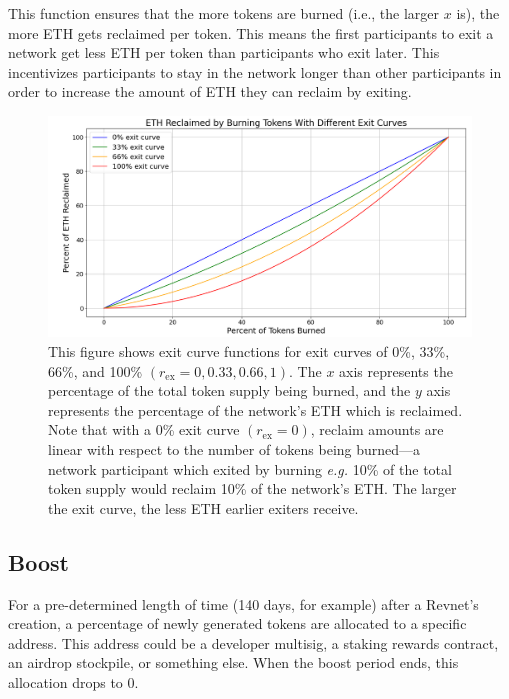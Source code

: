 \documentclass{article}
\begin{document}
This function ensures that the more tokens are burned (i.e., the larger $x$ is), the more ETH gets reclaimed per token. This means the first participants to exit a network get less ETH per token than participants who exit later. This incentivizes participants to stay in the network longer than other participants in order to increase the amount of ETH they can reclaim by exiting.

\begin{figure}[ht]
  \centering
  \includegraphics[width=\textwidth]{figures/multi-exit-curves.png}
  \caption{This figure shows exit curve functions for exit curves of 0\%, 33\%, 66\%, and 100\% $(r_{\text{ex}} = 0, 0.33, 0.66, 1)$. The $x$ axis represents the percentage of the total token supply being burned, and the $y$ axis represents the percentage of the network's ETH which is reclaimed. Note that with a 0\% exit curve $(r_{\text{ex}} = 0)$, reclaim amounts are linear with respect to the number of tokens being burned---a network participant which exited by burning \textit{e.g.} 10\% of the total token supply would reclaim 10\% of the network's ETH. The larger the exit curve, the less ETH earlier exiters receive.}
\end{figure}

\subsection{Boost}


For a pre-determined length of time (140 days, for example) after a Revnet's creation, a percentage of newly generated tokens are allocated to a specific address. This address could be a developer multisig, a staking rewards contract, an airdrop stockpile, or something else. When the boost period ends, this allocation drops to 0.
\end{document}

